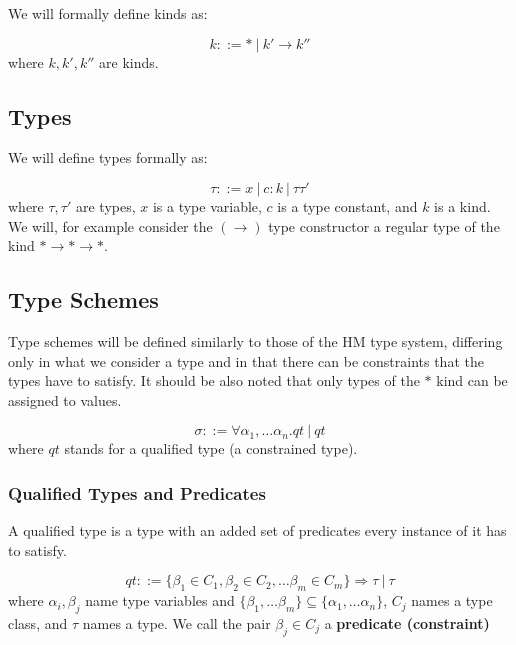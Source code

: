 We will formally define kinds as:

\begin{defn}[kinds]
    $$k ::= *\ |\ k' \rightarrow k''$$
    where $k, k', k''$ are kinds.
\end{defn}

\subsection{Types}

We will define types formally as:

\begin{defn}[types]
    $$\tau ::= x\ |\ c : k\ |\ \tau \tau'$$
    where $\tau, \tau'$ are types, $x$ is a type variable, $c$ is a type constant, and $k$ is a kind. We will, for example consider the $(\rightarrow)$ type constructor a regular type of the kind $* \rightarrow * \rightarrow *$.
\end{defn}

\subsection{Type Schemes}

Type schemes will be defined similarly to those of the HM type system, differing only in what we consider a type and in that there can be constraints that the types have to satisfy. It should be also noted that only types of the $*$ kind can be assigned to values.

\begin{defn}
    \label{defn:typeSchemes}
    $$\sigma ::= \forall \alpha_1, \dots \alpha_n . qt\ |\ qt$$
    where $qt$ stands for a qualified type (a constrained type).
\end{defn}

\subsubsection{Qualified Types and Predicates}

A qualified type is a type with an added set of predicates every instance of it has to satisfy.

\begin{defn}
    $$qt ::= \{\beta_1 \in C_1, \beta_2 \in C_2, \dots \beta_m \in C_m\} \Rightarrow \tau\ |\ \tau$$
    where $\alpha_i, \beta_j$ name type variables and $\{\beta_1, \dots \beta_m\} \subseteq \{\alpha_1, \dots \alpha_n\}$, $C_j$ names a type class, and $\tau$ names a type. We call the pair $\beta_j \in C_j$ a \textbf{predicate (constraint)} %
\end{defn}

